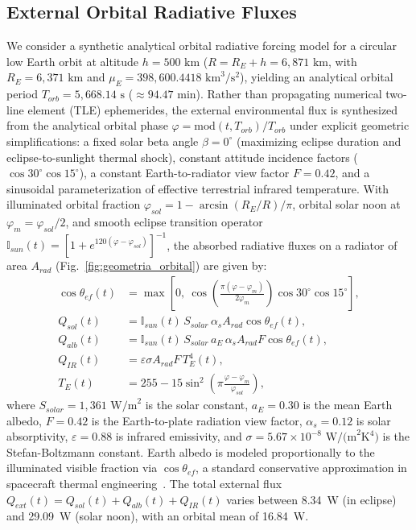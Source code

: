\documentclass[a4paper,fleqn]{cas-dc}
\begin{document}
\subsection{External Orbital Radiative Fluxes}
We consider a synthetic analytical orbital radiative forcing model for a circular low Earth orbit at altitude $h = 500\text{ km}$ ($R = R_E + h = 6,871\text{ km}$, with $R_E = 6,371\text{ km}$ and $\mu_E = 398,600.4418\text{ km}^3/\text{s}^2$), yielding an analytical orbital period $T_{orb} = 5,668.14\text{ s}$ ($\approx 94.47\text{ min}$). Rather than propagating numerical two-line element (TLE) ephemerides, the external environmental flux is synthesized from the analytical orbital phase $\varphi = \mathrm{mod}(t, T_{orb})/T_{orb}$ under explicit geometric simplifications: a fixed solar beta angle $\beta = 0^\circ$ (maximizing eclipse duration and eclipse-to-sunlight thermal shock), constant attitude incidence factors ($\cos 30^\circ \cos 15^\circ$), a constant Earth-to-radiator view factor $F = 0.42$, and a sinusoidal parameterization of effective terrestrial infrared temperature. With illuminated orbital fraction $\varphi_{sol} = 1 - \arcsin(R_E/R)/\pi$, orbital solar noon at $\varphi_m = \varphi_{sol}/2$, and smooth eclipse transition operator $\mathbb{I}_{sun}(t) = [1 + e^{120(\varphi - \varphi_{sol})}]^{-1}$, the absorbed radiative fluxes on a radiator of area $A_{rad}$ (Fig.~\ref{fig:geometria_orbital}) are given by:
\begin{align}
\cos\theta_{ef}(t) &= \max\!\left[0,\ \cos\!\left(\tfrac{\pi(\varphi-\varphi_m)}{2\varphi_m}\right)\cos 30^\circ \cos 15^\circ\right], \\
Q_{sol}(t) &= \mathbb{I}_{sun}(t)\, S_{solar}\, \alpha_s A_{rad} \cos\theta_{ef}(t), \\
Q_{alb}(t) &= \mathbb{I}_{sun}(t)\, S_{solar}\, a_E\, \alpha_s A_{rad} F \cos\theta_{ef}(t), \\
Q_{IR}(t) &= \varepsilon \sigma A_{rad} F\, T_E^4(t), \\
T_E(t) &= 255 - 15\sin^2\!\left(\pi\tfrac{\varphi-\varphi_m}{\varphi_{sol}}\right),
\end{align}
where $S_{solar} = 1,361\text{ W/m}^2$ is the solar constant, $a_E = 0.30$ is the mean Earth albedo, $F = 0.42$ is the Earth-to-plate radiation view factor, $\alpha_s = 0.12$ is solar absorptivity, $\varepsilon = 0.88$ is infrared emissivity, and $\sigma = 5.67 \times 10^{-8}\text{ W/(m}^2\text{K}^4)$ is the Stefan-Boltzmann constant. Earth albedo is modeled proportionally to the illuminated visible fraction via $\cos\theta_{ef}$, a standard conservative approximation in spacecraft thermal engineering~\citep{ecss2008thermal, gilmore2002handbook}. The total external flux $Q_{ext}(t) = Q_{sol}(t) + Q_{alb}(t) + Q_{IR}(t)$ varies between 8.34~W (in eclipse) and 29.09~W (solar noon), with an orbital mean of 16.84~W.
\end{document}
